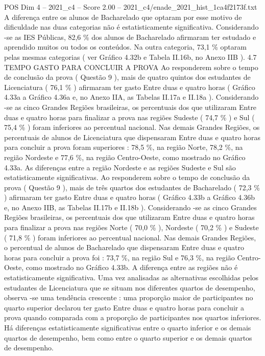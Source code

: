 \begin{textsample}{POS Dim 4 – 2021\_c4 – Score 2.00 – 2021\_c4/enade\_2021\_hist\_1ca4f2173f.txt}
A diferença entre os alunos de Bacharelado que optaram por esse motivo de dificuldade nas duas categorias não é estatisticamente significativa.
Considerando -se as IES Públicas, 82,6 \% dos alunos de Bacharelado afirmaram ter estudado e aprendido muitos ou todos os conteúdos.
Na outra categoria, 73,1 \% optaram pelas mesmas categorias ( ver Gráfico 4.32b e Tabela II.16b, no Anexo IIB ). 4.7 TEMPO GASTO PARA CONCLUIR A PROVA Ao responderem sobre o tempo de conclusão da prova ( Questão 9 ), mais de quatro quintos dos estudantes de Licenciatura ( 76,1 \% ) afirmaram ter gasto Entre duas e quatro horas ( Gráfico 4.33a a Gráfico 4.36a e, no Anexo IIA, as Tabelas II.17a e II.18a ).
Considerando -se as cinco Grandes Regiões brasileiras, os percentuais dos que utilizaram Entre duas e quatro horas para finalizar a prova nas regiões Sudeste ( 74,7 \% ) e Sul ( 75,4 \% ) foram inferiores ao percentual nacional.
Nas demais Grandes Regiões, os percentuais de alunos de Licenciatura que dispensaram Entre duas e quatro horas para concluir a prova foram superiores : 78,5 \%, na região Norte, 78,2 \%, na região Nordeste e 77,6 \%, na região Centro-Oeste, como mostrado no Gráfico 4.33a.
As diferenças entre a região Nordeste e as regiões Sudeste e Sul são estatisticamente significativas.
Ao responderem sobre o tempo de conclusão da prova ( Questão 9 ), mais de três quartos dos estudantes de Bacharelado ( 72,3 \% ) afirmaram ter gasto Entre duas e quatro horas ( Gráfico 4.33b a Gráfico 4.36b e, no Anexo IIB, as Tabelas II.17b e II.18b ).
Considerando -se as cinco Grandes Regiões brasileiras, os percentuais dos que utilizaram Entre duas e quatro horas para finalizar a prova nas regiões Norte ( 70,0 \% ), Nordeste ( 70,2 \% ) e Sudeste ( 71,8 \% ) foram inferiores ao percentual nacional.
Nas demais Grandes Regiões, o percentual de alunos de Bacharelado que dispensaram Entre duas e quatro horas para concluir a prova foi : 73,7 \%, na região Sul e 76,3 \%, na região Centro-Oeste, como mostrado no Gráfico 4.33b.
A diferença entre as regiões não é estatisticamente significativa.
Uma vez analisadas as alternativas escolhidas pelos estudantes de Licenciatura que se situam nos diferentes quartos de desempenho, observa -se uma tendência crescente : uma proporção maior de participantes no quarto superior declarou ter gasto Entre duas e quatro horas para concluir a prova quando comparada com a proporção de participantes nos quartos inferiores.
Há diferenças estatisticamente significativas entre o quarto inferior e os demais quartos de desempenho, bem como entre o quarto superior e os demais quartos de desempenho.

\end{textsample}
